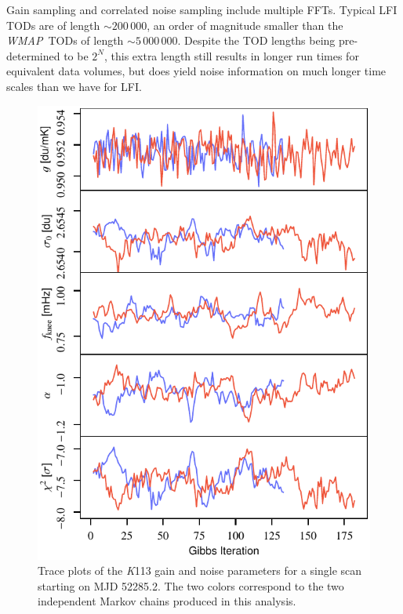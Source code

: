 \documentclass[twocolumn]{../../common/aa}
\def\WMAP{\emph{WMAP}}
\newcommand{\K}[0]{\textit K}
\begin{document}
Gain sampling and correlated noise sampling include multiple FFTs. Typical LFI TODs are of length $\sim200\,000$, an order of magnitude smaller than the \WMAP\ TODs of length $\sim5\,000\,000$. Despite the TOD lengths being pre-determined to be $2^N$, this extra length still results in longer run times for equivalent data volumes, but does yield noise information on much longer time scales than we have for LFI.  


\begin{figure}[t]
	\centering
	\includegraphics[width=\linewidth]{figures/instpar_CG_K113_samples_v1.pdf}
	\caption{Trace plots of the \K113 gain and noise parameters for a single scan starting on MJD 52285.2. The two colors correspond to the two independent Markov chains produced in this analysis.}
	\label{fig:inst_K113_gibbs}
\end{figure}
\end{document}
